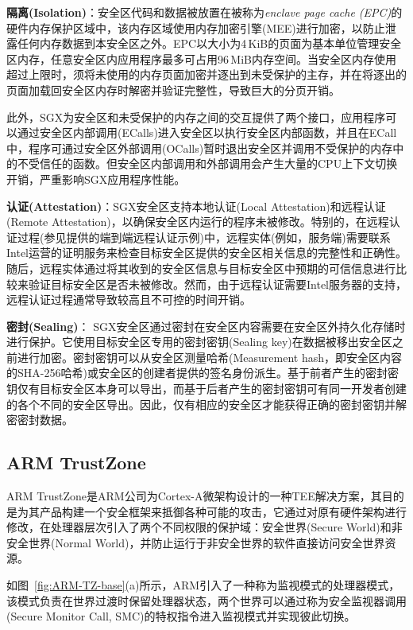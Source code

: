 \textbf{隔离(Isolation)}：安全区代码和数据被放置在被称为\textit{enclave page cache (EPC)}的硬件内存保护区域中，该内存区域使用内存加密引擎(MEE)进行加密，以防止泄露任何内存数据到本安全区之外。EPC以大小为4\,KiB的页面为基本单位管理安全区内存，任意安全区内应用程序最多可占用96\,MiB内存空间\cite{harnik2018SGX}。当安全区内存使用超过上限时，须将未使用的内存页面加密并逐出到未受保护的主存，并在将逐出的页面加载回安全区内存时解密并验证完整性，导致巨大的分页开销\cite{arnautov2016SCONE,dinhngoc2019Everything}。

此外，SGX为安全区和未受保护的内存之间的交互提供了两个接口，应用程序可以通过安全区内部调用(ECalls)进入安全区以执行安全区内部函数，并且在ECall中，程序可通过安全区外部调用(OCalls)暂时退出安全区并调用不受保护的内存中的不受信任的函数。但安全区内部调用和外部调用会产生大量的CPU上下文切换开销\cite{harnik2018SGX}，严重影响SGX应用程序性能。

\textbf{认证(Attestation)}：SGX安全区支持本地认证(Local Attestation)和远程认证(Remote Attestation)，以确保安全区内运行的程序未被修改。特别的，在远程认证过程(参见\cite{SGX-RA}提供的端到端远程认证示例)中，远程实体(例如，服务端)需要联系Intel运营的证明服务来检查目标安全区提供的安全区相关信息的完整性和正确性。随后，远程实体通过将其收到的安全区信息与目标安全区中预期的可信信息进行比较来验证目标安全区是否未被修改。然而，由于远程认证需要Intel服务器的支持，远程认证过程通常导致较高且不可控的时间开销。

\textbf{密封(Sealing)}： SGX安全区通过密封在安全区内容需要在安全区外持久化存储时进行保护。它使用目标安全区专用的密封密钥(Sealing key)在数据被移出安全区之前进行加密。密封密钥可以从安全区测量哈希(Measurement hash，即安全区内容的SHA-256哈希)或安全区的创建者提供的签名身份派生。基于前者产生的密封密钥仅有目标安全区本身可以导出，而基于后者产生的密封密钥可有同一开发者创建的各个不同的安全区导出。因此，仅有相应的安全区才能获得正确的密封密钥并解密密封数据。

\subsection{ARM TrustZone}
\label{subsec:background-tee-tz}

ARM TrustZone\cite{trustzone}是ARM公司为Cortex-A微架构\cite{cortex-a}设计的一种TEE解决方案，其目的是为其产品构建一个安全框架来抵御各种可能的攻击，它通过对原有硬件架构进行修改，在处理器层次引入了两个不同权限的保护域：安全世界(Secure World)和非安全世界(Normal World)，并防止运行于非安全世界的软件直接访问安全世界资源。

如图~\ref{fig:ARM-TZ-base}(a)所示，ARM引入了一种称为监视模式的处理器模式，该模式负责在世界过渡时保留处理器状态，两个世界可以通过称为安全监视器调用(Secure Monitor Call, SMC)的特权指令进入监视模式并实现彼此切换。

